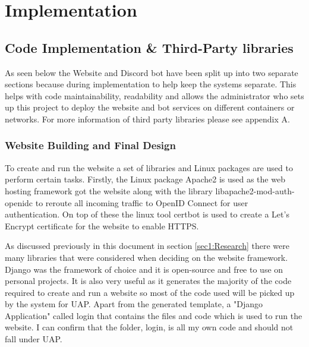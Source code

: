 \chapter{Implementation}

%
%

\section{Code Implementation \& Third-Party libraries}
As seen below the Website and Discord bot have been split up into two separate sections because during implementation to help keep the systems separate. This helps with code maintainability, readability and allows the administrator who sets up this project to deploy the website and bot services on different containers or networks. For more information of third party libraries please see appendix A.

\subsection{Website Building and Final Design}
To create and run the website a set of libraries and Linux packages are used to perform certain tasks. Firstly, the Linux package Apache2 \cite{apache2} is used as the web hosting framework got the website along with the library libapache2-mod-auth-openidc to reroute all incoming traffic to OpenID Connect \cite{OpenID} for user authentication. On top of these the linux tool certbot \cite{certbot} is used to create a Let's Encrypt certificate for the website to enable HTTPS. 

As discussed previously in this document in section \ref{sec1:Research} there were many libraries that were considered when deciding on the website framework. Django \cite{Django} was the framework of choice and it is open-source and free to use on personal projects. It is also very useful as it generates the majority of the code required to create and run a website so most of the code used will be picked up by the system for UAP. Apart from the generated template, a "Django Application" called login that contains the files and code which is used to run the website. I can confirm that the folder, login, is all my own code and should not fall under UAP.

